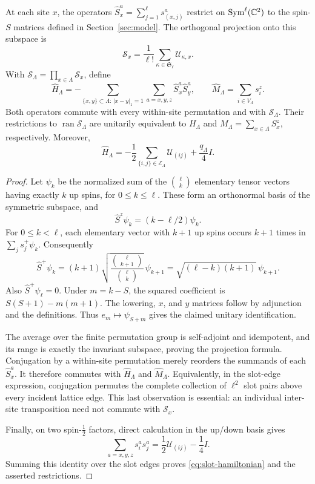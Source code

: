 \begin{lemma}\label{lem:slot-realization}
At each site $x$, the operators
$\widehat S_x^a=\sum_{j=1}^{\ell}s_{(x,j)}^a$ restrict on
$\operatorname{Sym}^{\ell}(\mathbb C^2)$ to the spin-$S$ matrices defined in
Section~\ref{sec:model}.  The orthogonal projection onto this subspace is
\[
 \mathcal S_x=\frac1{\ell!}
      \sum_{\kappa\in\mathfrak S_\ell}\mathcal U_{\kappa,x}.
\]
With $\mathcal S_\Lambda=\prod_{x\in\Lambda}\mathcal S_x$, define
\[
 \widehat H_\Lambda
 =-\sum_{\{x,y\}\subset\Lambda:\,|x-y|_1=1}
          \sum_{a=x,y,z}\widehat S_x^a\widehat S_y^a,
 \qquad
 \widehat M_\Lambda=\sum_{i\in V_\Lambda}s_i^z.
\]
Both operators commute with every within-site permutation and with
$\mathcal S_\Lambda$.  Their restrictions to
$\operatorname{ran}\mathcal S_\Lambda$ are unitarily equivalent to
$H_\Lambda$ and $M_\Lambda=\sum_{x\in\Lambda}S_x^z$, respectively.
Moreover,
\begin{equation}\label{eq:slot-hamiltonian}
 \widehat H_\Lambda
   =-\frac12\sum_{\{i,j\}\in\mathcal E_\Lambda}
                   \mathcal U_{(ij)}
       +\frac{q_\Lambda}{4}I.
\end{equation}
\end{lemma}

\begin{proof}
Let $\psi_k$ be the normalized sum of the $\binom\ell k$ elementary
tensor vectors having exactly $k$ up spins, for $0\le k\le\ell$.
These form an orthonormal basis of the symmetric subspace, and
\[
 \widehat S^z\psi_k=(k-\ell/2)\psi_k.
\]
For $0\le k<\ell$, each elementary vector with $k+1$ up spins occurs
$k+1$ times in $\sum_j s_j^+\psi_k$.  Consequently
\[
 \widehat S^+\psi_k
  =(k+1)\sqrt{\frac{\binom\ell{k+1}}{\binom\ell k}}\,\psi_{k+1}
  =\sqrt{(\ell-k)(k+1)}\,\psi_{k+1}.
\]
Also $\widehat S^+\psi_\ell=0$.  Under $m=k-S$, the squared coefficient is
$S(S+1)-m(m+1)$.  The lowering, $x$, and $y$ matrices follow by
adjunction and the definitions.  Thus $e_m\mapsto\psi_{S+m}$ gives the
claimed unitary identification.

The average over the finite permutation group is self-adjoint and
idempotent, and its range is exactly the invariant subspace, proving the
projection formula.  Conjugation by a within-site permutation merely
reorders the summands of each $\widehat S_x^a$.  It therefore commutes
with $\widehat H_\Lambda$ and $\widehat M_\Lambda$.  Equivalently, in
the slot-edge expression, conjugation permutes the complete collection
of $\ell^2$ slot pairs above every incident lattice edge.  This last
observation is essential: an individual inter-site transposition need
not commute with $\mathcal S_x$.

Finally, on two spin-$\tfrac12$ factors, direct calculation in the
up/down basis gives
\[
 \sum_{a=x,y,z}s_i^as_j^a
       =\frac12\mathcal U_{(ij)}-\frac14 I.
\]
Summing this identity over the slot edges proves
\eqref{eq:slot-hamiltonian} and the asserted restrictions.
\end{proof}

